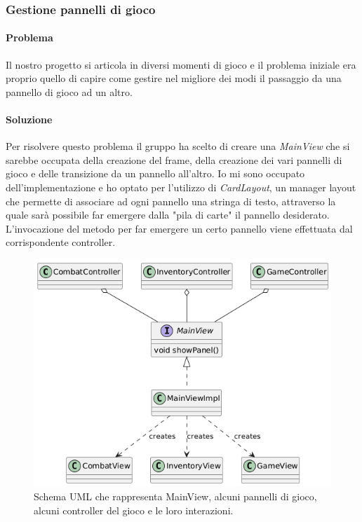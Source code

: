 \documentclass[a4paper,12pt]{report}
\begin{document}
\subsubsection{Gestione pannelli di gioco}

\paragraph{Problema} Il nostro progetto si articola in diversi momenti di gioco e il problema iniziale
era proprio quello di capire come gestire nel migliore dei modi il passaggio da una pannello di gioco ad 
un altro.
\paragraph{Soluzione} Per risolvere questo problema il gruppo ha scelto di creare una \textit{MainView} che
si sarebbe occupata della creazione del frame, della creazione dei vari pannelli di gioco e
delle transizione da un pannello all'altro.
Io mi sono occupato dell'implementazione e ho optato per l'utilizzo di \textit{CardLayout}, un manager layout
che permette di associare ad ogni pannello una stringa di testo, attraverso la quale sarà possibile far emergere
dalla "pila di carte" il pannello desiderato. L'invocazione del metodo per far emergere un certo pannello viene effettuata
dal corrispondente controller.
\begin{figure}[H]
	\centering{}
	\includegraphics[width=\textwidth]{img/mainView.png}
	\caption{Schema UML che rappresenta MainView, alcuni pannelli di gioco, alcuni controller del gioco e le loro interazioni.}
	\label{img:mainView}
\end{figure}
\end{document}
